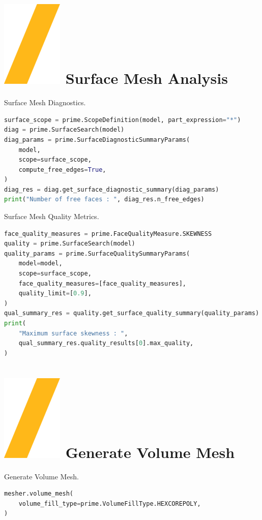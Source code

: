 \documentclass[9pt,landscape]{article}
\begin{document}
\begin{multicols}{3}
\section{\includegraphics[height=\fontcharht\font`\S]{slash.png} Surface Mesh Analysis}
Surface Mesh Diagnostics. 
\begin{lstlisting}[language=Python]
surface_scope = prime.ScopeDefinition(model, part_expression="*")
diag = prime.SurfaceSearch(model)
diag_params = prime.SurfaceDiagnosticSummaryParams(
    model,
    scope=surface_scope,
    compute_free_edges=True,
)
diag_res = diag.get_surface_diagnostic_summary(diag_params)
print("Number of free faces : ", diag_res.n_free_edges)
\end{lstlisting}

Surface Mesh Quality Metrics.
\begin{lstlisting}[language=Python]
face_quality_measures = prime.FaceQualityMeasure.SKEWNESS
quality = prime.SurfaceSearch(model)
quality_params = prime.SurfaceQualitySummaryParams(
    model=model,
    scope=surface_scope,
    face_quality_measures=[face_quality_measures],
    quality_limit=[0.9],
)
qual_summary_res = quality.get_surface_quality_summary(quality_params)
print(
    "Maximum surface skewness : ",
    qual_summary_res.quality_results[0].max_quality,
)
\end{lstlisting}

\section{\includegraphics[height=\fontcharht\font`\S]{slash.png} Generate Volume Mesh}
Generate Volume Mesh.
\begin{lstlisting}[language=Python]
mesher.volume_mesh(
    volume_fill_type=prime.VolumeFillType.HEXCOREPOLY,
)
\end{lstlisting}


\end{multicols}
\end{document}
